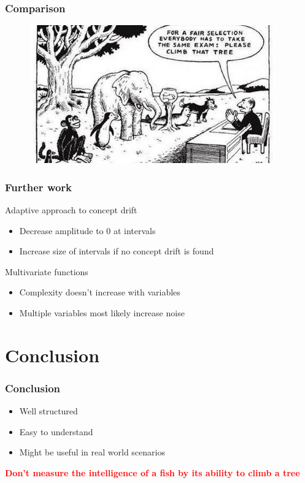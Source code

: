 \documentclass{beamer}
\begin{document}
\begin{frame}
    \frametitle{Comparison}
     \begin{figure}
            \centering
            \includegraphics[width=\textwidth]{images/fishtree.png}
            \label{fig:alg}
        \end{figure}
\end{frame}


\begin{frame}
    \frametitle{Further work}
    \begin{block}{Adaptive approach to concept drift}
        \begin{itemize}
            \item Decrease amplitude to 0 at intervals
            \item Increase size of intervals if no concept drift is found
        \end{itemize}
    \end{block}
    \begin{block}{Multivariate functions}
    \begin{itemize}
        \item Complexity doesn't increase with variables
        \item Multiple variables most likely increase noise
    \end{itemize}
    \end{block}
\end{frame}

\section{Conclusion}

\begin{frame}
  \frametitle{Conclusion}
  \begin{itemize}
      \item Well structured
      \item Easy to understand
      \item Might be useful in real world scenarios 
  \end{itemize}
  \begin{center}
  \textcolor{red}{\textbf{Don't measure the intelligence of a fish by its ability to climb a tree}}
  \end{center}

\end{frame}
\end{document}
